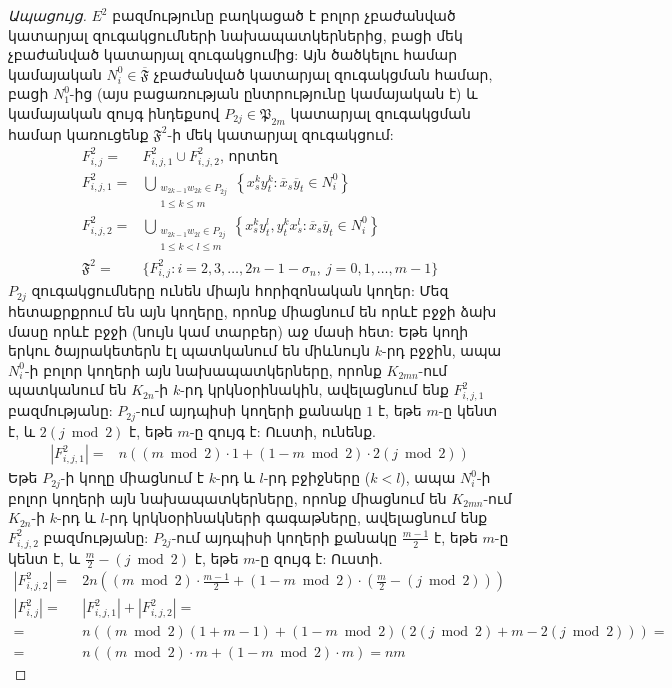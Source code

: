 \begin{hide}
\begin{proof}[Ապացույց]
$E^2$ բազմությունը բաղկացած է բոլոր չբաժանված կատարյալ զուգակցումների նախապատկերներից, բացի մեկ չբաժանված կատարյալ զուգակցումից: Այն ծածկելու համար կամայական $N^0_i \in \overline{\mathfrak{F}}$ չբաժանված կատարյալ զուգակցման համար, բացի $N^0_1$-ից (այս բացառության ընտրությունը կամայական է) և կամայական զույգ ինդեքսով $P_{2j} \in \mathfrak{P}_{2m}$ կատարյալ զուգակցման համար կառուցենք $\mathfrak{F}^2$-ի մեկ կատարյալ զուգակցում:
\begin{align*}
F^2_{i,j} = &F^2_{i,j,1} \cup F^2_{i,j,2}\text{, որտեղ }\\
F^2_{i,j,1} = &\bigcup\limits_{\substack{w_{2k-1}w_{2k} \in P_{2j} \\ 1 \leq k \leq m}}
\left\{x_s^ky_t^k : \overline{x}_s\overline{y}_t \in N^0_i\right\} \\
F^2_{i,j,2} = &\bigcup\limits_{\substack{w_{2k-1}w_{2l} \in P_{2j} \\ 1 \leq k < l \leq m}}
\left\{x_s^ky_t^l, y_t^kx_s^l : \overline{x}_s\overline{y}_t \in N^0_i\right\}\\
\mathfrak{F}^2 = &\{F^2_{i,j} : i=2,3,\ldots,2n-1-\sigma_n,\ j=0,1,\ldots,m-1\}
\end{align*}
$P_{2j}$ զուգակցումները ունեն միայն հորիզոնական կողեր: Մեզ հետաքրքրում են այն կողերը, որոնք միացնում են որևէ բջջի ձախ մասը որևէ բջջի (նույն կամ տարբեր) աջ մասի հետ: Եթե կողի երկու ծայրակետերն էլ պատկանում են միևնույն $k$-րդ բջջին, ապա $N_i^0$-ի բոլոր կողերի այն նախապատկերները, որոնք $K_{2mn}$-ում պատկանում են $K_{2n}$-ի $k$-րդ կրկնօրինակին, ավելացնում ենք $F^2_{i,j,1}$ բազմությանը: $P_{2j}$-ում այդպիսի կողերի քանակը $1$ է, եթե $m$-ը կենտ է, և $2(j \bmod 2)$ է, եթե $m$-ը զույգ է: Ուստի, ունենք.
\begin{align*}
|F^2_{i,j,1}| = &n\left( (m \bmod 2)\cdot 1 + (1 - m \bmod 2)\cdot 2(j \bmod 2) \right)
\end{align*}
Եթե $P_{2j}$-ի կողը միացնում է $k$-րդ և $l$-րդ բջիջները ($k < l$), ապա $N_i^0$-ի բոլոր կողերի այն նախապատկերները, որոնք միացնում են $K_{2mn}$-ում $K_{2n}$-ի $k$-րդ և $l$-րդ կրկնօրինակների գագաթները, ավելացնում ենք $F^2_{i,j,2}$ բազմությանը: $P_{2j}$-ում այդպիսի կողերի քանակը $\frac{m-1}{2}$ է, եթե $m$-ը կենտ է, և $\frac{m}{2} - (j \bmod 2)$ է, եթե $m$-ը զույգ է: Ուստի.
\begin{align*}
|F^2_{i,j,2}| = &2n\left( (m \bmod 2)\cdot \frac{m-1}{2} + (1 - m \bmod 2)\cdot \left(\frac{m}{2} - (j \bmod 2)\right) \right) \\
|F^2_{i,j}| = &|F^2_{i,j,1}| + |F^2_{i,j,2}| =\\
= &n\left(
	(m \bmod 2)(1+m-1) + 
    (1 - m \bmod 2)(2(j \bmod 2) + m - 2(j \bmod 2))
\right) =\\
= &n\left(
	(m \bmod 2) \cdot m + 
    (1 - m \bmod 2) \cdot m
\right) = nm
\end{align*}


\end{proof}
\end{hide}
